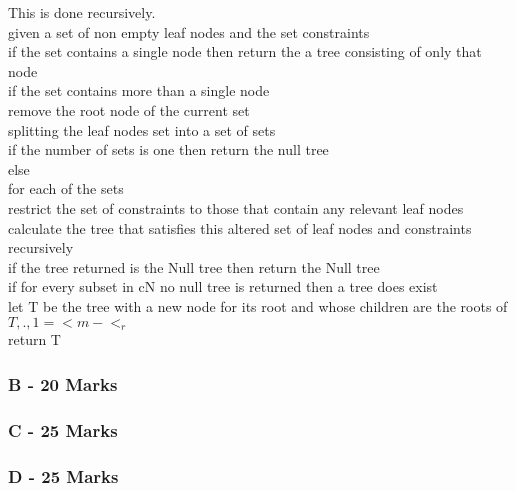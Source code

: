 \documentclass[paper=a4, fontsize=11pt]{scrartcl}
\numberwithin{equation}{section}		%
\numberwithin{figure}{section}			%
\numberwithin{table}{section}				%
\begin{document}
This is done recursively. \\
given a set of non empty leaf nodes and the set constraints\\
if the set contains a single node then return the a tree consisting of only that node \\
if the set contains more than a single node \\
remove the root node of the current set \\
splitting the leaf nodes set into a set of sets \\
if the number of sets is one then return the null tree \\
else \\
for each of the sets \\
restrict the set of constraints to those that contain any relevant leaf nodes \\
calculate the tree that satisfies this altered set of leaf nodes and constraints recursively \\
if the tree returned is the Null tree then return the Null tree \\
if for every subset in cN no null tree is returned then a tree does exist\\

let T be the tree with a new node for its root and whose children are the roots of $T,., 1 =< m -<_ r$ \\
return T

\subsubsection*{B - 20 Marks}

\iffalse
Expand the partition step (given below) in pseudocode
compute πC = S1, S2, . . . Sr;
\fi



\subsubsection*{C - 25 Marks}

\iffalse
Write a recurrence that expresses the running time of Build depending on the
number of different leaf-labels n and the number of constraints m. Use it to
estimate the running time of the algorithm assuming that the partitioning step
runs in time f (n, m) for some function monotonically nondecreasing function f.
\fi

\subsubsection*{D - 25 Marks}
\end{document}
